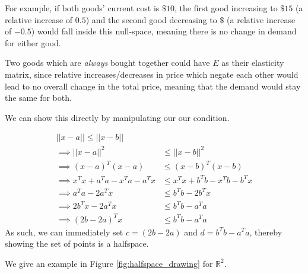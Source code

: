 \documentclass[12pt]{exam}
\newcommand{\Q}[1]{\question{\large{\textbf{#1}}}}
\begin{document}
\begin{questions}
\begin{solution}
\begin{enumerate}[label=(\alph*)]
    For example, if both goods' current cost is $\$10$, the first good increasing to $\$15$ (a relative increase of $0.5$) and the second good decreasing to $\$$ (a relative increase of $-0.5$) would fall inside this null-space, meaning there is no change in demand for either good.

    Two goods which are \textit{always} bought together could have $E$ as their elasticity matrix, since relative increases/decreases in price which negate each other would lead to no overall change in the total price, meaning that the demand would stay the same for both.
  \end{enumerate}
\end{solution}

\newpage
\Q{Halfspace}
\begin{solution}
  We can show this directly by manipulating our our condition.

  \begin{align*}
    ||x - a|| \leq || x - b || \\
    \implies ||x - a||^2 &\leq || x - b ||^2 \tag{Distance is always positive} \\
    \implies (x - a)^T(x - a) &\leq (x - b)^T(x - b) \tag{Dot product definition} \\
    \implies x^Tx + a^Ta -x^Ta - a^Tx &\leq x^Tx + b^Tb -x^Tb - b^Tx \tag{Expanding square} \\
    \implies a^Ta -2a^Tx &\leq b^Tb -2b^Tx \tag{$a^Tx$ is a scalar, some simplification} \\
    \implies 2b^Tx - 2a^Tx &\leq b^Tb - a^Ta \tag{Re-arranging terms} \\
    \implies (2b - 2a)^T x &\leq b^Tb - a^Ta
  \end{align*}
  As such, we can immediately set $c = (2b - 2a)$ and $d = b^Tb - a^T a$, thereby showing the set of points is a halfspace.

  We give an example in Figure \ref{fig:halfspace_drawing} for $\mathbb{R}^2$.
\end{solution}


\end{questions}
\end{document}
